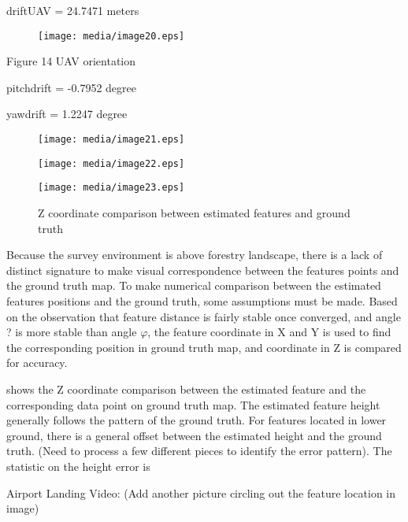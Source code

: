 driftUAV = 24.7471 meters

\begin{figure}[h]
\centering
\texttt{[image: media/image20.eps]}
\end{figure}


\begin{center}Figure 14 UAV orientation\end{center}

pitchdrift = -0.7952 degree

yawdrift = 1.2247 degree

\begin{figure}[h]
\centering
\texttt{[image: media/image21.eps]}
\end{figure}


\begin{figure}[h]
\centering
\texttt{[image: media/image22.eps]}
\end{figure}


\begin{figure}[h]
\centering
\texttt{[image: media/image23.eps]}
\caption{\label{figure:_Ref349487278} Z coordinate comparison between 
estimated features and ground truth}
\end{figure}



Because the survey environment is above forestry landscape, there is a 
lack of distinct signature to make visual correspondence between the 
features points and the ground truth map. To make numerical comparison 
between the estimated features positions and the ground truth, some 
assumptions must be made. Based on the observation that feature distance 
is fairly stable once converged, and angle ? is more stable than angle $
\varphi $, the feature coordinate in X and Y is used to find the 
corresponding position in ground truth map, and coordinate in Z is 
compared for accuracy. 

 shows the Z coordinate comparison between the estimated feature and the 
corresponding data point on ground truth map. The estimated feature 
height generally follows the pattern of the ground truth. For features 
located in lower ground, there is a general offset between the estimated 
height and the ground truth. (Need to process a few different pieces to 
identify the error pattern). The statistic on the height error is

Airport Landing Video: (Add another picture circling out the feature 
location in image)

